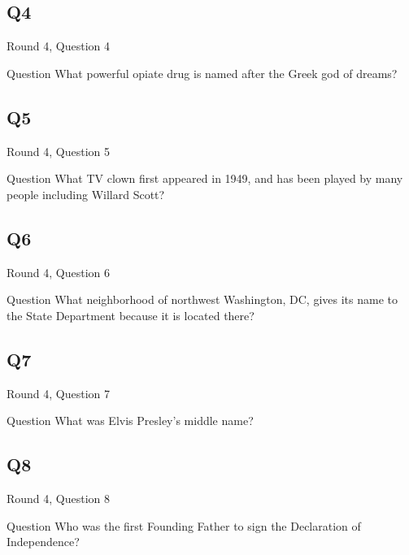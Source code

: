 \documentclass[11pt]{beamer}
\begin{document}
\subsection*{Q4}
\begin{frame}[t]{Round 4, Question 4}
\vspace{2em}
\begin{block}{Question}
What powerful opiate drug is named after the Greek god of dreams\@?
\end{block}
\end{frame}
    

\subsection*{Q5}
\begin{frame}[t]{Round 4, Question 5}
\vspace{2em}
\begin{block}{Question}
What TV clown first appeared in 1949, and has been played by many people including Willard Scott\@?
\end{block}
\end{frame}
    

\subsection*{Q6}
\begin{frame}[t]{Round 4, Question 6}
\vspace{2em}
\begin{block}{Question}
What neighborhood of northwest Washington, DC, gives its name to the State Department because it is located there\@?
\end{block}
\end{frame}
    

\subsection*{Q7}
\begin{frame}[t]{Round 4, Question 7}
\vspace{2em}
\begin{block}{Question}
What was Elvis Presley's middle name\@?
\end{block}
\end{frame}
    

\subsection*{Q8}
\begin{frame}[t]{Round 4, Question 8}
\vspace{2em}
\begin{block}{Question}
Who was the first Founding Father to sign the Declaration of Independence\@?
\end{block}
\end{frame}
    
\end{document}
